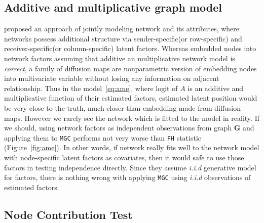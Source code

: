 \documentclass[12pt]{article}
\theoremstyle{definition}
\begin{document}
\subsection{Additive and multiplicative graph model}



\cite{hoff2002latent} proposed an approach of jointly modeling network and its attributes, where networks possess additional structure via sender-specific(or row-specific) and receiver-specific(or column-specific) latent factors. Whereas \cite{fosdick2015testing} embedded nodes into network factors assuming that additive an multiplicative network model is \textit{correct}, a family of diffusion maps are nonparametric version of embedding nodes into multivariate variable without losing any information on adjacent relationship. Thus in the model~\ref{eq:ame}, where logit of $A$ is an additive and multiplicative function of their estimated factors, estimated latent position would be very close to the truth, much closer than embedding made from diffusion maps. However we rarely see the network which is fitted to the model in reality. If we should, using network factors as independent observations from graph \textbf{G} and applying them to \texttt{MGC} performs not very worse than \texttt{FH} statistic (Figure~\ref{fig:ame}). In other words, if network really fits well to the network model with node-specific latent factors as covariates, then it would safe to use those factors in testing independence directly. Since they assume \textit{i.i.d} generative model for factors, there is nothing wrong with applying \texttt{MGC} using \textit{i.i.d} observations of estimated factors.

\subsection{Node Contribution Test}
\label{ssec:node}
\end{document}
